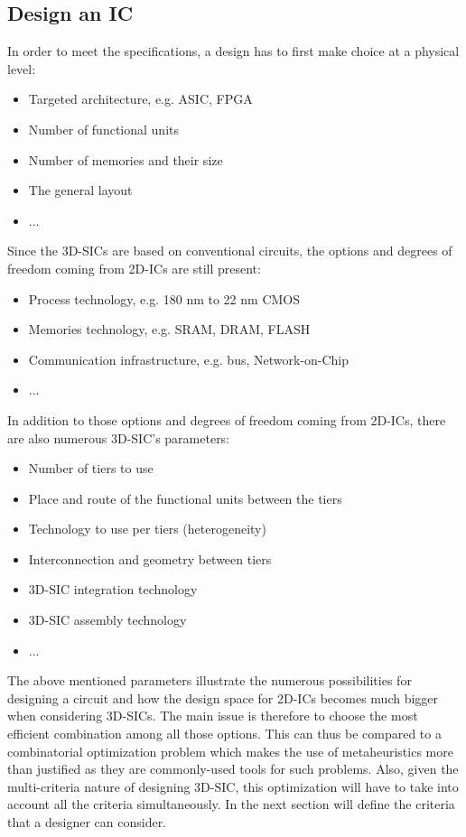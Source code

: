\subsection{Design an IC}
In order to meet the specifications, a design has to first make choice at a physical level:
\begin{itemize}
\item Targeted architecture, e.g. ASIC, FPGA
\item Number of functional units
\item Number of memories and their size
\item The general layout
\item ...
\end{itemize}
Since the 3D-SICs are based on conventional circuits, the options and degrees of freedom coming from 2D-ICs are still present:
\begin{itemize}
\item Process technology, e.g. 180 nm to 22 nm CMOS
\item Memories technology, e.g. SRAM, DRAM, FLASH
\item Communication infrastructure, e.g. bus, Network-on-Chip
\item ...
\end{itemize}
In addition to those options and degrees of freedom coming from 2D-ICs, there are also numerous 3D-SIC's parameters:
\begin{itemize}
\item Number of tiers to use
\item Place and route of the functional units between the tiers
\item Technology to use per tiers (heterogeneity)
\item Interconnection and geometry between tiers
\item 3D-SIC integration technology
\item 3D-SIC assembly technology
\item ...
\end{itemize}

The above mentioned parameters illustrate the numerous possibilities for designing a circuit and how the design space for 2D-ICs becomes much bigger when considering 3D-SICs. The main issue is therefore to choose the most efficient combination among all those options. This can thus be compared to a combinatorial optimization problem which makes the use of metaheuristics more than justified as they are commonly-used tools for such problems. Also, given the multi-criteria nature of designing 3D-SIC, this optimization will have to take into account all the criteria simultaneously. In the next section will define the criteria that a designer can consider.

